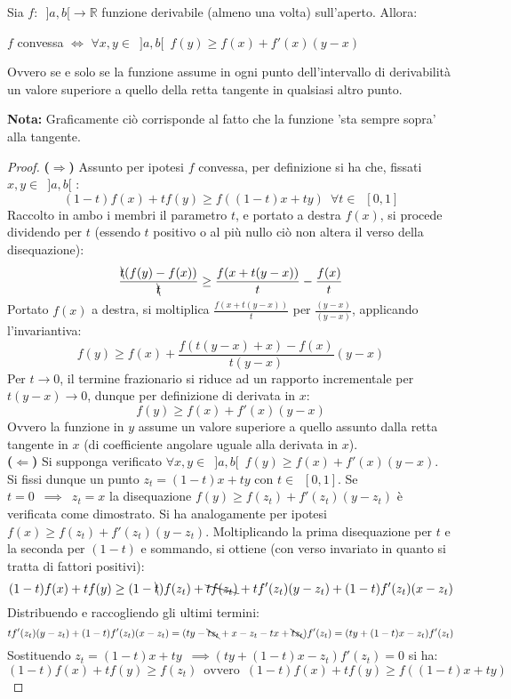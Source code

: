 \documentclass[10pt, oneside]{book}
\theoremstyle{plain}
\begin{document}
\begin{ther}
Sia $f : \enspace ]a, b[ \rightarrow \mathbb{R}$ funzione derivabile (almeno una volta) sull'aperto. Allora:
\begin{center}
    $f$ convessa $\Longleftrightarrow$ $\forall x,y \in \enspace ]a, b[ \enspace f(y) \geq f(x) + f'(x) (y-x)$\\
\end{center}
Ovvero se e solo se la funzione assume in ogni punto dell'intervallo di derivabilità un valore superiore a quello della retta tangente in qualsiasi altro punto.
\end{ther}
\textbf{Nota:} Graficamente ciò corrisponde al fatto che la funzione 'sta sempre sopra' alla tangente. 
\begin{proof}
\textbf{($\Rightarrow$)} Assunto per ipotesi $f$ convessa, per definizione si ha che, fissati $x, y \in \enspace ]a, b[$ : 
\[(1-t) f(x) + t f(y) \geq f((1-t) x + t y) \enspace \forall t \in \enspace [0, 1]\]
Raccolto in ambo i membri il parametro $t$, e portato a destra $f(x)$, si procede dividendo per $t$ (essendo $t$ positivo o al più nullo ciò non altera il verso della disequazione):
\[\frac{\bcancel{t} (f(y) - f(x))}{\bcancel{t}} \geq \frac{f(x + t (y - x))}{t} - \frac{f(x)}{t}\]
Portato $f(x)$ a destra, si moltiplica $ \displaystyle \frac{f(x + t (y - x))}{t}$ per $\displaystyle \frac{(y - x)}{(y - x)}$, applicando l'invariantiva:
\[f(y) \geq f(x) + \frac{f(t(y-x) + x) - f(x)}{t (y-x)}(y - x)\]
Per $t \rightarrow 0$, il termine frazionario si riduce ad un rapporto incrementale per $t (y - x) \rightarrow 0$, dunque per definizione di derivata in $x$:
\[f(y) \geq f(x) + f'(x) (y - x)\]
Ovvero la funzione in $y$ assume un valore superiore a quello assunto dalla retta tangente in $x$ (di coefficiente angolare uguale alla derivata in $x$).\\
\textbf{($\Leftarrow$)} Si supponga verificato $\forall x, y \in \enspace ]a, b[ \enspace f(y) \geq f(x) + f'(x) (y - x)$.
\\Si fissi dunque un punto $z_t = (1 - t) x + t y$ con $t \in \enspace [0,1]$. Se $t = 0 \enspace \implies \enspace z_t = x$ la disequazione $f(y) \geq f(z_t) + f'(z_t) (y - z_t)$ è verificata come dimostrato. Si ha analogamente per ipotesi $f(x) \geq f(z_t) + f'(z_t) (y - z_t)$. Moltiplicando la prima disequazione per $t$ e la seconda per $(1 - t)$ e sommando, si ottiene (con verso invariato in quanto si tratta di fattori positivi):
\[(1-t) f(x) + t f(y) \geq (1-\bcancel{t}) f(z_t) + \bcancel{t f(z_t)}+ t f'(z_t) (y - z_t) + (1 - t) f'(z_t) (x - z_t)\]
Distribuendo e raccogliendo gli ultimi termini:
\[t f'(z_t) (y - z_t) + (1 - t) f'(z_t) (x - z_t) = (t y - \bcancel{t z_t} + x - z_t - t x + \bcancel{t z_t}) f'(z_t) = (t y + (1-t) x - z_t) f'(z_t)\]
Sostituendo $z_t = (1 - t) x + t y \enspace \implies (t y + (1-t) x - z_t) f'(z_t) = 0$ si ha:
\[(1- t) f(x) + t f(y) \geq f(z_t) \enspace \textrm{ovvero} \enspace (1-t) f(x) + t f(y) \geq f((1-t) x + t y)\]
\end{proof}
\end{document}
